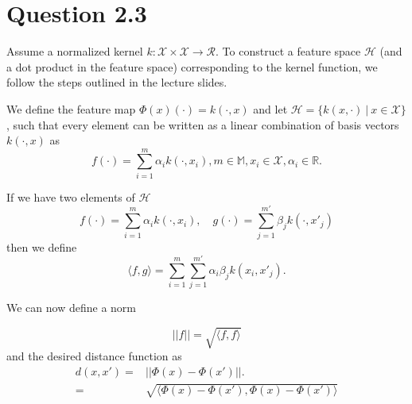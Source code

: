 \section*{Question 2.3}

	

Assume a normalized kernel $k : \mathcal{X} \times \mathcal{X}
\rightarrow \mathcal{R}$.  To construct a feature space $\mathcal{H}$
(and a dot product in the feature space) corresponding to the kernel
function, we follow the steps outlined in the lecture slides.

We define the feature map $\Phi(x)(\cdot) = k(\cdot, x)$ and let
$\mathcal{H}=\{k(x,\cdot)\ |\ x\in\mathcal{X}\}$, such that every
element can be written as a linear combination of basis vectors
$k(\cdot, x)$ as
\[
f(\cdot) = \sum_{i=1}^m\alpha_ik(\cdot,x_i), m\in \mathbb{M},x_i\in\mathcal{X},\alpha_i\in\mathbb{R}.
\]

If we have two elements of $\mathcal{H}$
\[
f(\cdot) = \sum_{i=1}^m\alpha_ik(\cdot,x_i),\quad
g(\cdot) = \sum_{j=1}^{m'}\beta_jk(\cdot,x'_j)
\]
then we define
\[
\langle f, g\rangle = \sum_{i=1}^m\sum_{j=1}^{m'}\alpha_i\beta_jk(x_i,x'_j).
\]

We can now define a norm

\[
||f|| = \sqrt{\langle f, f\rangle}
\]
and the desired distance function as
\begin{align*}
d(x,x') =& ||\Phi(x)-\Phi(x')||.\\
=& \sqrt{\langle \Phi(x)-\Phi(x'), \Phi(x)-\Phi(x')\rangle}
\end{align*}
